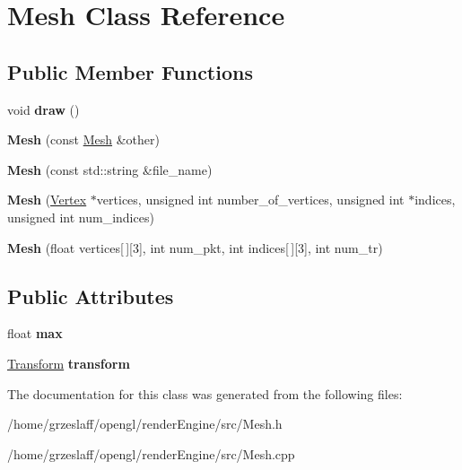 \hypertarget{classMesh}{\section{Mesh Class Reference}
\label{classMesh}
}
\subsection*{Public Member Functions}
\begin{DoxyCompactItemize}
\item 
\hypertarget{classMesh_a996a8668fa2ca7d95d6d10744c833bc8}{void {\bfseries draw} ()}\label{classMesh_a996a8668fa2ca7d95d6d10744c833bc8}

\item 
\hypertarget{classMesh_af1bd04d292a520ce226a685b6ed49fbe}{{\bfseries Mesh} (const \hyperlink{classMesh}{Mesh} \&other)}\label{classMesh_af1bd04d292a520ce226a685b6ed49fbe}

\item 
\hypertarget{classMesh_a052f0fac7361903a016d3e5c263cb127}{{\bfseries Mesh} (const std\-::string \&file\-\_\-name)}\label{classMesh_a052f0fac7361903a016d3e5c263cb127}

\item 
\hypertarget{classMesh_a4e44b166b065b4a149e570bf4bde6979}{{\bfseries Mesh} (\hyperlink{classVertex}{Vertex} $\ast$vertices, unsigned int number\-\_\-of\-\_\-vertices, unsigned int $\ast$indices, unsigned int num\-\_\-indices)}\label{classMesh_a4e44b166b065b4a149e570bf4bde6979}

\item 
\hypertarget{classMesh_ab137b87c35c0085952cd500d373448c8}{{\bfseries Mesh} (float vertices\mbox{[}$\,$\mbox{]}\mbox{[}3\mbox{]}, int num\-\_\-pkt, int indices\mbox{[}$\,$\mbox{]}\mbox{[}3\mbox{]}, int num\-\_\-tr)}\label{classMesh_ab137b87c35c0085952cd500d373448c8}

\end{DoxyCompactItemize}
\subsection*{Public Attributes}
\begin{DoxyCompactItemize}
\item 
\hypertarget{classMesh_a0f274b964358e07faa543421f0c79327}{float {\bfseries max}}\label{classMesh_a0f274b964358e07faa543421f0c79327}

\item 
\hypertarget{classMesh_adaae6716e6366111013999f0979038df}{\hyperlink{classTransform}{Transform} {\bfseries transform}}\label{classMesh_adaae6716e6366111013999f0979038df}

\end{DoxyCompactItemize}


The documentation for this class was generated from the following files\-:\begin{DoxyCompactItemize}
\item 
/home/grzeslaff/opengl/render\-Engine/src/Mesh.\-h\item 
/home/grzeslaff/opengl/render\-Engine/src/Mesh.\-cpp\end{DoxyCompactItemize}
